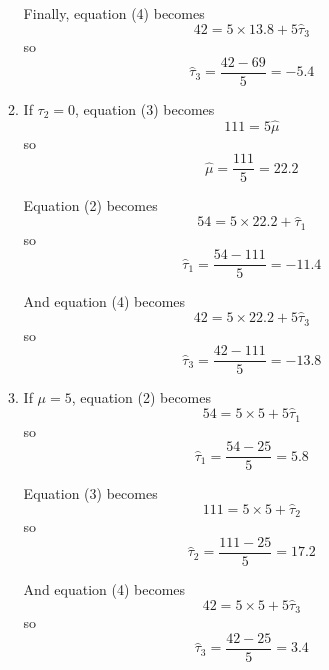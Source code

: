 \documentclass[11pt]{article}
\begin{document}
\begin{enumerate}
\begin{enumerate}
Finally, equation (4) becomes
\begin{equation*}
42=5\times 13.8+5\widehat\tau_3
\end{equation*}
so
\begin{equation*}
\widehat\tau_3=\frac{42-69}{5}=-5.4
\end{equation*}

\item %
If \(\tau_2=0\), equation (3) becomes
\begin{equation*}
111=5\widehat\mu
\end{equation*}
so
\begin{equation*}
\widehat\mu=\frac{111}{5}=22.2
\end{equation*}

Equation (2) becomes
\begin{equation*}
54=5\times 22.2+\widehat\tau_1
\end{equation*}
so
\begin{equation*}
\widehat\tau_1=\frac{54-111}{5}=-11.4
\end{equation*}

And equation (4) becomes
\begin{equation*}
42=5\times 22.2+5\widehat\tau_3
\end{equation*}
so
\begin{equation*}
\widehat\tau_3=\frac{42-111}{5}=-13.8
\end{equation*}

\item %
If \(\mu=5\), equation (2) becomes
\begin{equation*}
54=5\times 5+5\widehat\tau_1
\end{equation*}
so
\begin{equation*}
\widehat\tau_1=\frac{54-25}{5}=5.8
\end{equation*}

Equation (3) becomes
\begin{equation*}
111=5\times 5+\widehat\tau_2
\end{equation*}
so
\begin{equation*}
\widehat\tau_2=\frac{111-25}{5}=17.2
\end{equation*}

And equation (4) becomes
\begin{equation*}
42=5\times 5+5\widehat\tau_3
\end{equation*}
so
\begin{equation*}
\widehat\tau_3=\frac{42-25}{5}=3.4
\end{equation*}


\end{enumerate}
\end{enumerate}
\end{document}
